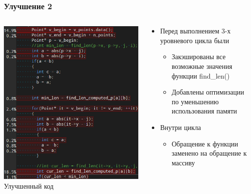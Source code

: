 \documentclass[10pt]{beamer}
\begin{document}
\begin{frame}
\frametitle{Улучшение 2}


\begin{columns}[c]

\begin{center}
  \includegraphics[width=\textwidth]{res/img/AnalysisTargetWizard3CodeCropped.png}
  Улучшенный код
\end{center}

\begin{block}{}
  \begin{itemize}
    \item Перед выполнением 3-х уровневого цикла были
    \begin{itemize}
      \item Закэшированы все возможные значения функции find\_len()
      \item Добавлены оптимизации по уменьшению использования памяти
    \end{itemize}
    \item Внутри цикла
    \begin{itemize}
      \item Обращение к функции заменено на обращение к массиву
    \end{itemize}
  \end{itemize}
\end{block}

\end{columns}

\end{frame}
\end{document}
